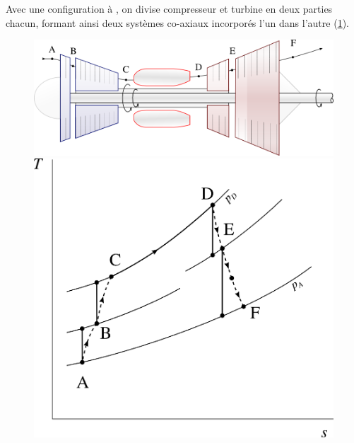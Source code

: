 		Avec une configuration à , on divise compresseur et turbine en deux parties chacun, formant ainsi deux systèmes co-axiaux incorporés l’un dans l’autre (\cref{fig_axes_multiples}).

		\begin{figure}
			\begin{center}
				\includegraphics[scale=0.6]{images/circuit_twin_spool.png}\vspace{0.5cm}
				\includegraphics[scale=0.8]{images/ts_gp_twin_spool.png}
			\end{center}
			\label{fig_axes_multiples}
		\end{figure}

